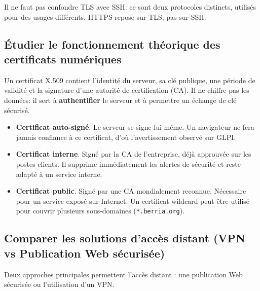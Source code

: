 \noindent Il ne faut pas confondre TLS avec SSH: ce sont deux protocoles distincts, utilisés pour des usages différents. HTTPS repose sur TLS, pas sur SSH.

\medskip

\subsection*{Étudier le fonctionnement théorique des certificats numériques}
{}

\noindent Un certificat X.509 contient l'identité du serveur, sa clé publique, une période de validité et la signature d'une autorité de certification (CA). Il ne chiffre pas les données: il sert à \textbf{authentifier} le serveur et à permettre un échange de clé sécurisé.

\begin{itemize}
  \item \textbf{Certificat auto-signé}. Le serveur se signe lui-même. Un navigateur ne fera jamais confiance à ce certificat, d'où l'avertissement observé sur GLPI.
  \item \textbf{Certificat interne}. Signé par la CA de l'entreprise, déjà approuvée sur les postes clients. Il supprime immédiatement les alertes de sécurité et reste adapté à un service interne.
  \item \textbf{Certificat public}. Signé par une CA mondialement reconnue. Nécessaire pour un service exposé sur Internet. Un certificat wildcard peut être utilisé pour couvrir plusieurs sous-domaines (\texttt{*.berria.org}).
\end{itemize}

\medskip

\subsection*{Comparer les solutions d'accès distant (VPN vs Publication Web sécurisée)}
{}

\noindent Deux approches principales permettent l'accès distant : une publication Web sécurisée ou l'utilisation d'un VPN.

